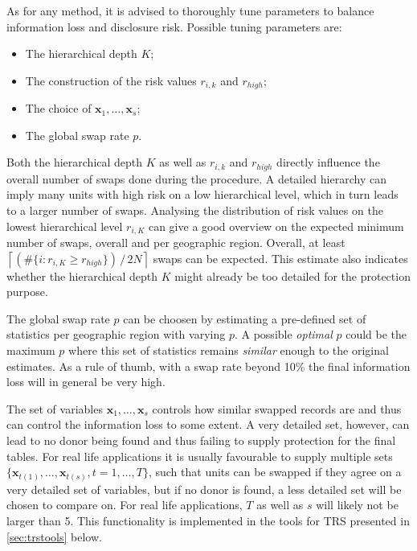As for any method, it is advised to thoroughly tune parameters to balance information loss and disclosure risk. Possible tuning parameters are:

\begin{itemize}
\item The hierarchical depth $K$;
\item The construction of the risk values $r_{i,k}$ and $r_{high}$; 
\item The choice of $\mathbf{x}_1,\ldots,\mathbf{x}_s$; 
\item The global swap rate $p$.
\end{itemize}

\noindent Both the hierarchical depth $K$ as well as $r_{i,k}$ and $r_{high}$ directly influence the overall number of swaps done during the procedure. A detailed hierarchy can imply many units with high risk on a low hierarchical level, which in turn leads to a larger number of swaps. Analysing the distribution of risk values on the lowest hierarchical level $r_{i,K}$ can give a good overview on the expected minimum number of swaps, overall and per geographic region. Overall, at least 
$\left\lceil (\#\{i:r_{i,K}\geq r_{high}\}) \,/\, 2N \right\rceil$
swaps can be expected. This estimate also indicates whether the hierarchical depth $K$ might already be too detailed for the protection purpose.\newline

\noindent The global swap rate $p$ can be choosen by estimating a pre-defined set of statistics per geographic region with varying $p$. A possible \textit{optimal} $p$ could be the maximum $p$ where this set of statistics remains \textit{similar} enough to the original estimates.
As a rule of thumb, with a swap rate beyond 10\% the final information loss will in general be very high.\newline

\noindent The set of variables $\mathbf{x}_1,\ldots,\mathbf{x}_s$ controls how similar swapped records are and thus can control the information loss to some extent. A very detailed set, however, can lead to no donor being found and thus failing to supply protection for the final tables. For real life applications it is usually favourable to supply multiple sets $\{\mathbf{x}_{t(1)},\ldots,\mathbf{x}_{t(s)}, t=1,\ldots , T\}$, such that units can be swapped if they agree on a very detailed set of variables, but if no donor is found, a less detailed set will be chosen to compare on. For real life applications, $T$ as well as $s$ will likely not be larger than 5. This functionality is implemented in the tools for TRS presented in \ref{sec:trstools} below. \newline

